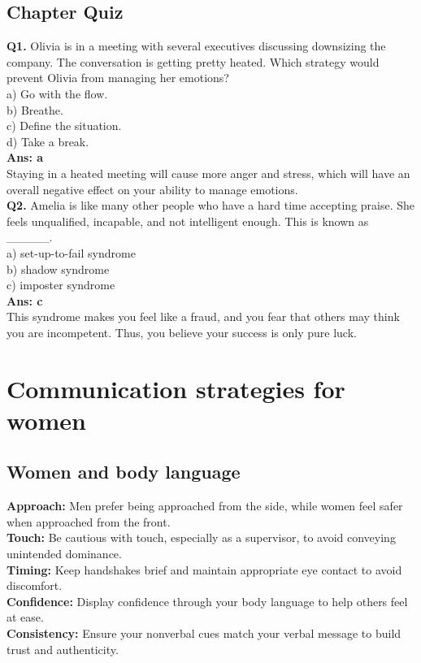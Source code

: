 \documentclass[12pt]{article}
\begin{document}
\subsection{Chapter Quiz}
\textbf{Q1.} Olivia is in a meeting with several executives discussing downsizing the company. The conversation is getting pretty heated. Which strategy would prevent Olivia from managing her emotions?\\
a) Go with the flow.\\
b) Breathe. \\  
c) Define the situation. \\  
d) Take a break. \\
\textbf{Ans: a} \\
Staying in a heated meeting will cause more anger and stress, which will have an overall negative effect on your ability to manage emotions.\\
\textbf{Q2.} Amelia is like many other people who have a hard time accepting praise. She feels unqualified, incapable, and not intelligent enough. This is known as \_\_\_\_\_.\\
a) set-up-to-fail syndrome \\ 
b) shadow syndrome \\  
c) imposter syndrome \\
\textbf{Ans: c} \\
This syndrome makes you feel like a fraud, and you fear that others may think you are incompetent. Thus, you believe your success is only pure luck.

\section{ Communication strategies for women}

\subsection{Women and body language}
\textbf{Approach:} Men prefer being approached from the side, while women feel safer when approached from the front.\\
\textbf{Touch:} Be cautious with touch, especially as a supervisor, to avoid conveying unintended dominance.\\
\textbf{Timing:} Keep handshakes brief and maintain appropriate eye contact to avoid discomfort.\\
\textbf{Confidence:} Display confidence through your body language to help others feel at ease.\\
\textbf{Consistency:} Ensure your nonverbal cues match your verbal message to build trust and authenticity.
\end{document}
